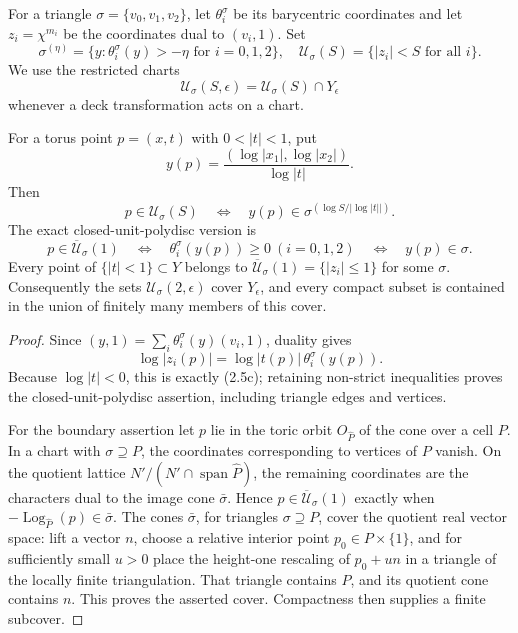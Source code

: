 For a triangle \(\sigma=\{v_0,v_1,v_2\}\), let
\(\theta_i^\sigma\) be its barycentric coordinates and let
\(z_i=\chi^{m_i}\) be the coordinates dual to
\((v_i,1)\).  Set
\[
 \sigma^{(\eta)}=\{y:\theta_i^\sigma(y)>-\eta\text{ for }i=0,1,2\},
 \quad
 \mathcal U_\sigma(S)=\{|z_i|<S\text{ for all }i\}.
\]
We use the restricted charts
\[
 \mathcal U_\sigma(S,\epsilon)=\mathcal U_\sigma(S)\cap Y_\epsilon
\]
whenever a deck transformation acts on a chart.

\begin{lemma}
\label{lem:toric-chart-control}
For a torus point \(p=(x,t)\) with \(0<|t|<1\), put
\[
 y(p)=\frac{(\log|x_1|,\log|x_2|)}{\log|t|}.
\]
Then
\[
 p\in\mathcal U_\sigma(S)
 \quad\Longleftrightarrow\quad
 y(p)\in\sigma^{(\log S/|\log|t||)}.
 \tag{2.5c}
\]
The exact closed-unit-polydisc version is
\begin{equation}
 p\in\overline{\mathcal U}_\sigma(1)
 \quad\Longleftrightarrow\quad
 \theta_i^\sigma(y(p))\ge0\ (i=0,1,2)
 \quad\Longleftrightarrow\quad y(p)\in\sigma.
\label{eq:cusp-closed-chart-identity}
\end{equation}
Every point of \(\{|t|<1\}\subset Y\) belongs to
\(\overline{\mathcal U}_\sigma(1)=\{|z_i|\le1\}\) for some \(\sigma\).
Consequently the sets \(\mathcal U_\sigma(2,\epsilon)\) cover \(Y_\epsilon\), and
every compact subset is contained in the union of finitely many members of
this cover.
\end{lemma}

\begin{proof}
Since \((y,1)=\sum_i\theta_i^\sigma(y)(v_i,1)\), duality gives
\[
 \log|z_i(p)|=\log|t(p)|\,\theta_i^\sigma(y(p)).
\]
Because \(\log|t|<0\), this is exactly (2.5c); retaining non-strict
inequalities proves the closed-unit-polydisc assertion, including triangle
edges and vertices.

For the boundary assertion let \(p\) lie in the toric orbit
\(O_{\widehat P}\) of the cone over a cell \(P\).  In a chart with
\(\sigma\supseteq P\), the coordinates corresponding to vertices of
\(P\) vanish.  On the quotient lattice
\(N'/(N'\cap\operatorname{span}\widehat P)\), the remaining coordinates
are the characters dual to the image cone \(\bar\sigma\).  Hence
\(p\in\overline{\mathcal U}_\sigma(1)\) exactly when
\(-\operatorname{Log}_{\widehat P}(p)\in\bar\sigma\).
The cones \(\bar\sigma\), for triangles \(\sigma\supseteq P\), cover the
quotient real vector space: lift a vector \(n\), choose a relative interior
point \(p_0\in P\times\{1\}\), and for sufficiently small \(u>0\) place
the height-one rescaling of \(p_0+un\) in a triangle of the locally finite
triangulation.  That triangle contains \(P\), and its quotient cone contains
\(n\).  This proves the asserted cover.  Compactness then supplies a finite
subcover.
\end{proof}


